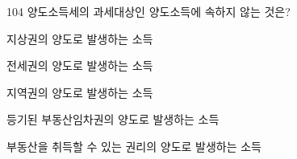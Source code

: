 \begin{question}{104}
양도소득세의 과세대상인 양도소득에 속하지 않는 것은?
\begin{choices}
  \item 지상권의 양도로 발생하는 소득
  \item 전세권의 양도로 발생하는 소득
  \item 지역권의 양도로 발생하는 소득
  \item 등기된 부동산임차권의 양도로 발생하는 소득
  \item 부동산을 취득할 수 있는 권리의 양도로 발생하는 소득
\end{choices}
\end{question}
